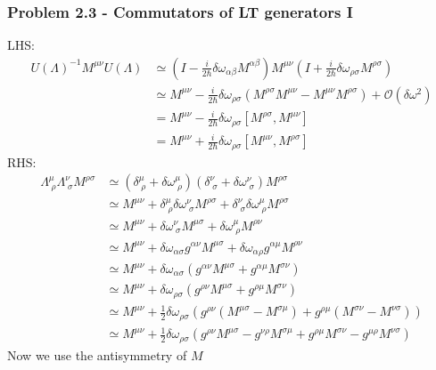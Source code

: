 \documentclass[10pt,a4paper]{article}
\theoremstyle{definition}
\begin{document}
\subsubsection{Problem 2.3 - Commutators of LT generators I}
LHS:
\begin{align}
U(\Lambda)^{-1}M^{\mu\nu}U(\Lambda)
&\simeq\left(I-\frac{i}{2\hbar}\delta\omega_{\alpha\beta}M^{\alpha\beta}\right)M^{\mu\nu}\left(I+\frac{i}{2\hbar}\delta\omega_{\rho\sigma}M^{\rho\sigma}\right)\\
&\simeq M^{\mu\nu}-\frac{i}{2\hbar}\delta\omega_{\rho\sigma}(M^{\rho\sigma}M^{\mu\nu}-M^{\mu\nu}M^{\rho\sigma})+\mathcal{O}(\delta\omega^2)\\
&= M^{\mu\nu}-\frac{i}{2\hbar}\delta\omega_{\rho\sigma}[M^{\rho\sigma},M^{\mu\nu}]\\
&= M^{\mu\nu}+\frac{i}{2\hbar}\delta\omega_{\rho\sigma}[M^{\mu\nu},M^{\rho\sigma}]
\end{align}
RHS:
\begin{align}
\Lambda^{\mu}_{\;\rho}\Lambda^\nu_{\;\sigma}M^{\rho\sigma}
&\simeq\left(\delta^{\mu}_{\;\rho}+\delta\omega^{\mu}_{\;\rho}\right)\left(\delta^{\nu}_{\;\sigma}+\delta\omega^{\nu}_{\;\sigma}\right)M^{\rho\sigma}\\
&\simeq M^{\mu\nu}+\delta^\mu_{\;\rho}\delta\omega^\nu_{\;\sigma}M^{\rho\sigma}+\delta^\nu_{\;\sigma}\delta\omega^\mu_{\;\rho}M^{\rho\sigma}\\
&\simeq M^{\mu\nu}+\delta\omega^\nu_{\;\sigma}M^{\mu\sigma}+\delta\omega^\mu_{\;\rho}M^{\rho\nu}\\
&\simeq M^{\mu\nu}+\delta\omega_{\alpha\sigma}g^{\alpha\nu}M^{\mu\sigma}+\delta\omega_{\alpha\rho}g^{\alpha\mu}M^{\rho\nu}\\
&\simeq M^{\mu\nu}+\delta\omega_{\alpha\sigma}(g^{\alpha\nu}M^{\mu\sigma}+g^{\alpha\mu}M^{\sigma\nu})\\
&\simeq M^{\mu\nu}+\delta\omega_{\rho\sigma}(g^{\rho\nu}M^{\mu\sigma}+g^{\rho\mu}M^{\sigma\nu})\\
&\simeq M^{\mu\nu}+\frac{1}{2}\delta\omega_{\rho\sigma}\left(g^{\rho\nu}(M^{\mu\sigma}-M^{\sigma\mu})+g^{\rho\mu}(M^{\sigma\nu}-M^{\nu\sigma})\right)\\
&\simeq M^{\mu\nu}+\frac{1}{2}\delta\omega_{\rho\sigma}\left(g^{\rho\nu}M^{\mu\sigma}-g^{\nu\rho}M^{\sigma\mu}+g^{\rho\mu}M^{\sigma\nu}-g^{\mu\rho}M^{\nu\sigma}\right)
\end{align}
Now we use the antisymmetry of $M$ 
\end{document}
